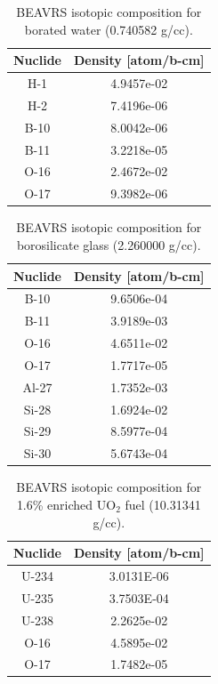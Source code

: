 \begin{appendices}
\begin{table}[h!]
  \centering
  \caption[BEAVRS isotopic composition for borated water]{BEAVRS isotopic composition for borated water (0.740582 g/cc).}
  \footnotesize
  \label{table:chap7-beavrs-isotopes-water}
  \vspace{6pt}
  \begin{tabular}{c c}
  \toprule
  \rowcolor{lightgray}
  {\bf Nuclide} &
  {\bf Density [atom/b-cm]} \\
  \midrule
  H-1 & 4.9457e-02 \\
  H-2 & 7.4196e-06 \\
  B-10 & 8.0042e-06 \\
  B-11 & 3.2218e-05 \\
  O-16 & 2.4672e-02 \\
  O-17 & 9.3982e-06 \\
  \bottomrule
\end{tabular}
\end{table}

\begin{table}[h!]
  \centering
  \caption[BEAVRS isotopic composition for borosilicate glass]{BEAVRS isotopic composition for borosilicate glass (2.260000 g/cc).}
  \footnotesize
  \label{table:chap7-beavrs-isotopes-borosilicate}
  \vspace{6pt}
  \begin{tabular}{c c}
  \toprule
  \rowcolor{lightgray}
  {\bf Nuclide} &
  {\bf Density [atom/b-cm]} \\
  \midrule
  B-10 & 9.6506e-04 \\
  B-11 & 3.9189e-03 \\
  O-16 & 4.6511e-02 \\
  O-17 & 1.7717e-05 \\
  Al-27 & 1.7352e-03 \\
  Si-28 & 1.6924e-02 \\
  Si-29 & 8.5977e-04 \\
  Si-30 & 5.6743e-04 \\
  \bottomrule
\end{tabular}
\end{table}

\begin{table}[h!]
  \centering
  \caption[BEAVRS isotopic composition for 1.6\% enriched UO$_2$]{BEAVRS isotopic composition for 1.6\% enriched UO$_2$ fuel (10.31341 g/cc).}
  \footnotesize
  \label{table:chap7-beavrs-isotopes-1.6-uo2}
  \vspace{6pt}
  \begin{tabular}{c c}
  \toprule
  \rowcolor{lightgray}
  {\bf Nuclide} &
  {\bf Density [atom/b-cm]} \\
  \midrule
  U-234 & 3.0131E-06 \\
  U-235 & 3.7503E-04 \\
  U-238 & 2.2625e-02 \\
  O-16 & 4.5895e-02 \\
  O-17 & 1.7482e-05 \\
  \bottomrule
\end{tabular}
\end{table}


\end{appendices}
